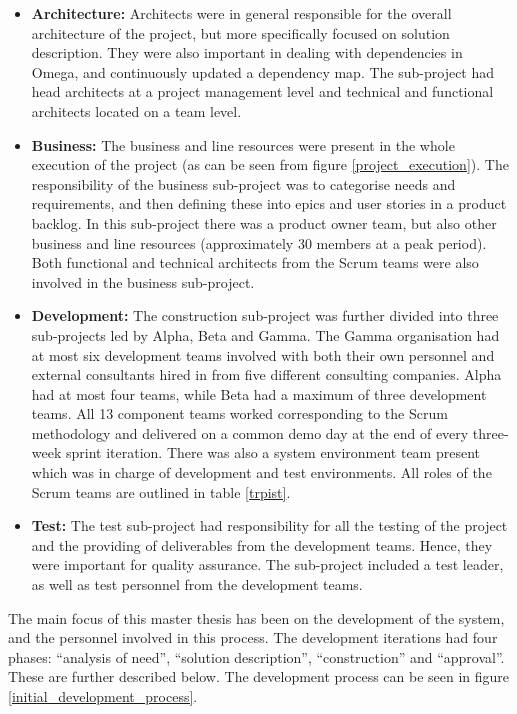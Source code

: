 \begin{itemize}
   \item \textbf{Architecture:} Architects were in general responsible for the overall architecture of the project, but more specifically focused on solution description. They were also important in dealing with dependencies in Omega, and continuously updated a dependency map. The sub-project had head architects at a project management level and technical and functional architects located on a team level.
   \item \textbf{Business:} The business and line resources were present in the whole execution of the project (as can be seen from figure \ref{project_execution}). The responsibility of the business sub-project was to categorise needs and requirements, and then defining these into epics and user stories in a product backlog. In this sub-project there was a product owner team, but also other business and line resources (approximately 30 members at a peak period). Both functional and technical architects from the Scrum teams were also involved in the business sub-project.
   \item \textbf{Development:} The construction sub-project was further divided into three sub-projects led by Alpha, Beta and Gamma. The Gamma organisation had at most six development teams involved with both their own personnel and external consultants hired in from five different consulting companies. Alpha had at most four teams, while Beta had a maximum of three development teams. All 13 component teams worked corresponding to the Scrum methodology and delivered on a common demo day at the end of every three-week sprint iteration. There was also a system environment team present which was in charge of development and test environments. All roles of the Scrum teams are outlined in table \ref{trpist}.
   \item \textbf{Test:} The test sub-project had responsibility for all the testing of the project and the providing of deliverables from the development teams. Hence, they were important for quality assurance. The sub-project included a test leader, as well as test personnel from the development teams.
\end{itemize}

The main focus of this master thesis has been on the development of the system, and the personnel involved in this process. The development iterations had four phases: ``analysis of need'', ``solution description'', ``construction'' and ``approval''. These are further described below. The development process can be seen in figure \ref{initial_development_process}.

